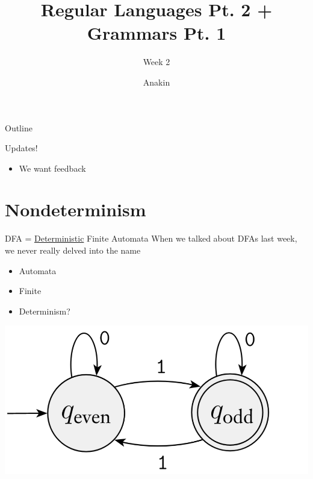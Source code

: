 \documentclass[aspectratio=169]{beamer}
\title{Regular Languages Pt. 2 + Grammars Pt. 1}
\subtitle{Week 2}
\author{Anakin}
\date{}
\begin{document}

\begin{frame}
\titlepage
\end{frame}

\begin{frame}{Outline}
  \tableofcontents
\end{frame}

\begin{frame}{Updates!}
  \pause
  \begin{itemize}
    \item We want feedback
  \end{itemize}
\end{frame}

\section{Nondeterminism}
\frame{\sectionpage}

\begin{frame}{DFA = \underline{Deterministic} Finite Automata}
    When we talked about DFAs last week, we never really delved into the name \pause
    \begin{itemize}
        \item Automata \pause
        \item Finite \pause
        \item Determinism?
    \end{itemize}
\end{frame}

\begin{frame}{}
    \begin{center}
        \includegraphics[width=\textwidth]{oddDFA.png}
    \end{center}
\end{frame}
\end{document}
